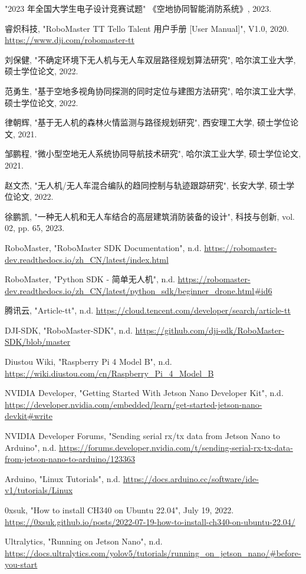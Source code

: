 \documentclass[12pt, a4paper, oneside]{article}
\begin{document}
\begin{thebibliography}{99}

	 "2023 年全国大学生电子设计竞赛试题" 《空地协同智能消防系统》, 2023.
	
	 睿炽科技, "RoboMaster TT Tello Talent 用户手册 [User Manual]", V1.0, 2020. \url{https://www.dji.com/robomaster-tt}
	
	 刘保健, "不确定环境下无人机与无人车双层路径规划算法研究", 哈尔滨工业大学, 硕士学位论文, 2022.
	
	 范勇生, "基于空地多视角协同探测的同时定位与建图方法研究", 哈尔滨工业大学, 硕士学位论文, 2022.
	
	 律朝辉, "基于无人机的森林火情监测与路径规划研究", 西安理工大学, 硕士学位论文, 2021.
	
	 邹鹏程, "微小型空地无人系统协同导航技术研究", 哈尔滨工业大学, 硕士学位论文, 2021.
	
	 赵文杰, "无人机/无人车混合编队的趋同控制与轨迹跟踪研究", 长安大学, 硕士学位论文, 2022.
	
	 徐鹏凯, "一种无人机和无人车结合的高层建筑消防装备的设计", 科技与创新, vol. 02, pp. 65, 2023.
	
	 RoboMaster, "RoboMaster SDK Documentation", n.d. \url{https://robomaster-dev.readthedocs.io/zh_CN/latest/index.html}
	
	 RoboMaster, "Python SDK - 简单无人机", n.d. \url{https://robomaster-dev.readthedocs.io/zh_CN/latest/python_sdk/beginner_drone.html#id6}
	
	 腾讯云, "Article-tt", n.d. \url{https://cloud.tencent.com/developer/search/article-tt}
	
	 DJI-SDK, "RoboMaster-SDK", n.d. \url{https://github.com/dji-sdk/RoboMaster-SDK/blob/master}
	
	 Diustou Wiki, "Raspberry Pi 4 Model B", n.d. \url{https://wiki.diustou.com/cn/Raspberry_Pi_4_Model_B}
	
	 NVIDIA Developer, "Getting Started With Jetson Nano Developer Kit", n.d. \url{https://developer.nvidia.com/embedded/learn/get-started-jetson-nano-devkit#write}
	
	 NVIDIA Developer Forums, "Sending serial rx/tx data from Jetson Nano to Arduino", n.d. \url{https://forums.developer.nvidia.com/t/sending-serial-rx-tx-data-from-jetson-nano-to-arduino/123363}
	
	 Arduino, "Linux Tutorials", n.d. \url{https://docs.arduino.cc/software/ide-v1/tutorials/Linux}
	
	 0xsuk, "How to install CH340 on Ubuntu 22.04", July 19, 2022. \url{https://0xsuk.github.io/posts/2022-07-19-how-to-install-ch340-on-ubuntu-22.04/}
	
	 Ultralytics, "Running on Jetson Nano", n.d. \url{https://docs.ultralytics.com/yolov5/tutorials/running_on_jetson_nano/#before-you-start}

\end{thebibliography}
\end{document}
